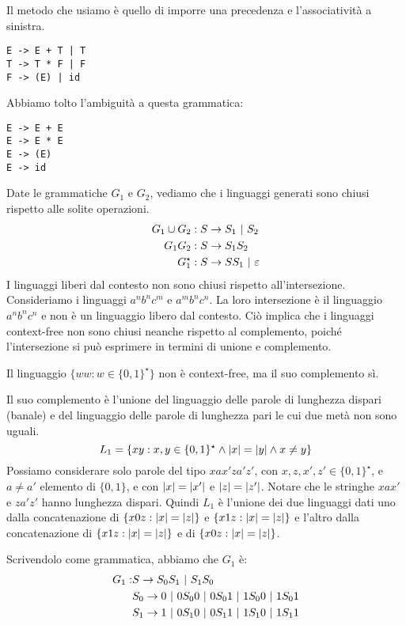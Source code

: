 Il metodo che usiamo \`e quello di imporre una precedenza e l'associativit\`a a sinistra.
\begin{verbatim}
E -> E + T | T
T -> T * F | F
F -> (E) | id
\end{verbatim}
Abbiamo tolto l'ambiguit\`a a questa grammatica:
\begin{verbatim}
E -> E + E
E -> E * E
E -> (E)
E -> id
\end{verbatim}
Date le grammatiche $G_1$ e $G_2$, vediamo che i linguaggi generati sono chiusi rispetto alle solite operazioni.
\begin{align*}
	G_1 \cup G_2 & : S \to S_1 \ | \  S_2 \\
	G_1 G_2 & : S \to S_1 S_2 \\
	G_1^{\star} & : S \to S S_1 \ | \  \varepsilon
\end{align*}
I linguaggi liberi dal contesto non sono chiusi rispetto all'intersezione.
Consideriamo i linguaggi $a^n b^n c^m$ e $a^m b^n c^n$.
La loro intersezione \`e il linguaggio $a^n b^n c^n$ e non \`e un linguaggio libero dal contesto.
Ci\`o implica che i linguaggi context-free non sono chiusi neanche rispetto al complemento, poich\'e l'intersezione si pu\`o esprimere in termini di unione e complemento.

Il linguaggio $\{ ww : w \in \{0,1\}^{\star}\}$ non \`e context-free, ma il suo complemento s\`i.

Il suo complemento \`e l'unione del linguaggio delle parole di lunghezza dispari (banale) e del linguaggio delle parole di lunghezza pari le cui due met\`a non sono uguali.
\[
	L_1 = \{ xy : x,y \in \{0,1\}^{\star} \land \left\lvert{x}\right\rvert = \left\lvert{y}\right\rvert \land x \neq y \}
\]
Possiamo considerare solo parole del tipo $xax'za'z'$, con $x,z,x',z' \in \{0,1\}^{\star}$, e $a \neq a'$ elemento di $\{0,1\}$, e con $\left\lvert{x}\right\rvert = \left\lvert{x'}\right\rvert$ e $\left\lvert{z}\right\rvert = \left\lvert{z'}\right\rvert$.
Notare che le stringhe $xax'$ e $za'z'$ hanno lunghezza dispari.
Quindi $L_1$ \`e l'unione dei due linguaggi dati uno dalla concatenazione di $\{ x0z : \left\lvert{x}\right\rvert = \left\lvert{z}\right\rvert \}$ e $\{ x1z : \left\lvert{x}\right\rvert = \left\lvert{z}\right\rvert \}$ e l'altro dalla concatenazione di $\{ x1z : \left\lvert{x}\right\rvert = \left\lvert{z}\right\rvert \}$ e di $\{ x0z : \left\lvert{x}\right\rvert = \left\lvert{z}\right\rvert \}$.

Scrivendolo come grammatica, abbiamo che $G_1$ \`e:
\begin{align*}
G_1 :& S \to S_0 S_1 \ | \  S_1 S_0 \\
& S_0 \to 0 \ | \  0 S_0 0 \ | \  0 S_0 1 \ | \  1 S_0 0 \ | \  1 S_0 1 \\
& S_1 \to 1 \ | \  0 S_1 0 \ | \  0 S_1 1 \ | \  1 S_1 0 \ | \  1 S_1 1
\end{align*}


